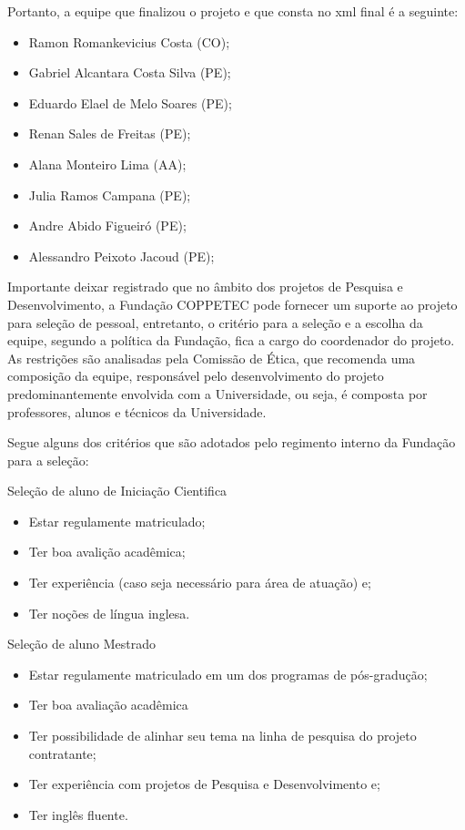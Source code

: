 Portanto, a equipe que finalizou o projeto e que consta no xml final é a
seguinte:

\begin{itemize}
\item Ramon Romankevicius Costa (CO);
\item Gabriel Alcantara Costa Silva (PE);
\item Eduardo Elael de Melo Soares (PE);
\item Renan Sales de Freitas (PE);
\item Alana Monteiro Lima (AA);
\item Julia Ramos Campana (PE);
\item Andre Abido Figueiró (PE);
\item Alessandro Peixoto Jacoud (PE);
\end{itemize}

Importante deixar registrado que no âmbito dos projetos de Pesquisa e
Desenvolvimento, a Fundação COPPETEC pode fornecer um suporte ao projeto
para seleção de pessoal, entretanto, o critério para a seleção e a escolha da
equipe, segundo a política da Fundação, fica a cargo do coordenador do projeto.
As restrições são analisadas pela Comissão de Ética, que recomenda uma
composição da equipe, responsável pelo desenvolvimento do projeto
predominantemente envolvida com a Universidade, ou seja, é composta por
professores, alunos e técnicos da Universidade.

Segue alguns dos critérios que são adotados pelo regimento interno da Fundação
para a seleção:

Seleção de aluno de Iniciação Cientifica
\begin{itemize}
  \item Estar regulamente matriculado;
  \item Ter boa avalição acadêmica;
  \item Ter experiência (caso seja necessário para área de atuação) e;
  \item Ter noções de língua inglesa.
 \end{itemize}
  
Seleção de aluno Mestrado
\begin{itemize}
  \item Estar regulamente matriculado em um dos programas de pós-gradução;
  \item Ter boa avaliação acadêmica
  \item Ter possibilidade de alinhar seu tema na linha de pesquisa do projeto
contratante;
  \item Ter experiência com projetos de Pesquisa e Desenvolvimento e;
  \item Ter inglês fluente.
\end{itemize}

